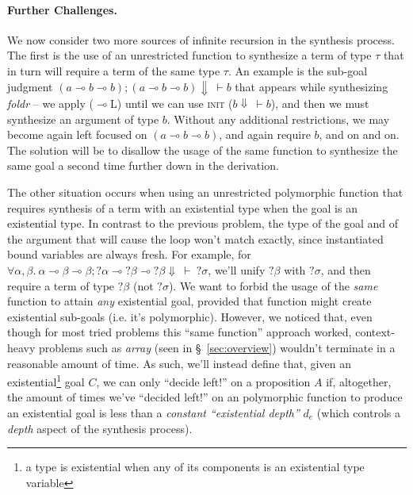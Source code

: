 \documentclass{llncs}
\newcommand{\lolli}{\multimap}
\newcommand{\mypara}[1]{\paragraph{\textbf{#1}.}}
\begin{document}
\mypara{Further Challenges} We now consider two more sources of infinite
recursion in the synthesis process. The first is the use of an unrestricted
function to synthesize a term of type $\tau$ that in turn will require a term of
the same type $\tau$. An example is the sub-goal judgment $(a \lolli
b \lolli b); (a \lolli b \lolli b) \Downarrow\ \vdash b$ that
appears while synthesizing \emph{foldr} -- we apply ($\lolli$L)
until we can use \textsc{init} ($b \Downarrow\ \vdash b$), and then we must
synthesize an argument of type $b$. Without any additional restrictions, we
may become again left focused on $(a \lolli b \lolli b)$, and again require $b$,
and on and on. The solution will be to disallow the usage of the same function
to synthesize the same goal a second time further down in the derivation.

The other situation occurs when using an unrestricted polymorphic function that
requires synthesis of a term with an existential type when the goal is an
existential type. In contrast to the previous problem, the type of the goal and
of the argument that will cause the loop won't match exactly, since instantiated
bound variables are always fresh. For example, for $\forall \alpha,\beta .\
\alpha\lolli\beta\lolli\beta;?\alpha\lolli?\beta\lolli?\beta \Downarrow\ \vdash\
?\sigma$, we'll unify $?\beta$ with $?\sigma$, and then require a term of type
$?\beta$ (not $?\sigma$). We want to forbid the usage of the \emph{same}
function to attain \emph{any} existential goal, provided that function might
create existential sub-goals (i.e. it's polymorphic). However, we noticed that,
even though for most tried problems this ``same function'' approach worked,
context-heavy problems such as \emph{array} (seen in \S~\ref{sec:overview})
wouldn't terminate in a reasonable amount of time.
%
%
As such, we'll instead define that, given an existential\footnote{a type 
is existential when any of its components is an existential type variable} goal $C$,
we can only ``decide left!'' on a proposition $A$ if, altogether, 
the amount of times we've ``decided left!'' on an polymorphic function to produce
an existential goal is less than a \emph{constant ``existential depth''} $d_e$
(which controls a \emph{depth} aspect of the synthesis process).
%
\end{document}
